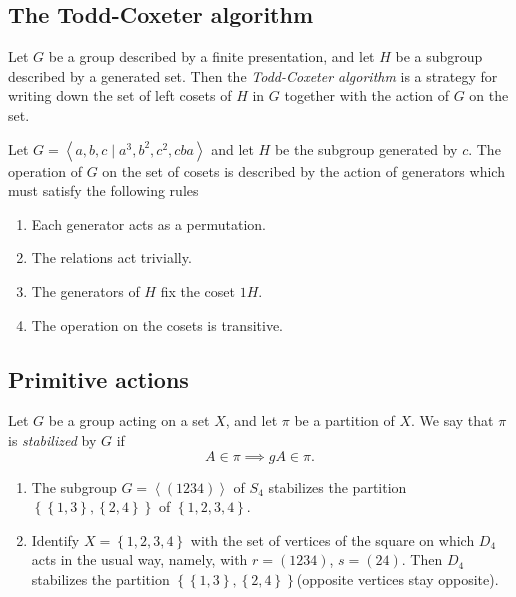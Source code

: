 \subsection{The Todd-Coxeter algorithm}
\label{subsection-the-Todd-Coxeter-algorithm}

Let \( G \) be a group described by a finite presentation, and let \( H \) be a subgroup described by a generated set.
Then the \emph{Todd-Coxeter algorithm} is a strategy for writing down the set of left cosets of \( H \) in \( G \) together with the action of \( G \) on the set.

Let \( G = \left\langle a, b, c \mid a^3, b^2, c^2, cba \right\rangle \) and let \( H \) be the subgroup generated by \( c \).
The operation of \( G \) on the set of cosets is described by the action of generators which must satisfy the following rules
\begin{enumerate}
  \item Each generator acts as a permutation.
  \item The relations act trivially.
  \item The generators of \( H \) fix the coset \( 1H \).
  \item The operation on the cosets is transitive.
\end{enumerate}

\subsection{Primitive actions}
\label{subsection-primitive-actions}

\begin{definition}
  \label{definition-stabilized-partition}
  Let \( G \) be a group acting on a set \( X \), and let \( \pi \) be a partition of \( X \).
  We say that \( \pi \) is \emph{stabilized} by \( G \) if
  \[
    A \in \pi \implies gA \in \pi.
  \]
\end{definition}

\begin{example}
  \label{example-stabilized-action-on-1234}
  \begin{enumerate}
    \item The subgroup \( G = \left\langle (1234) \right\rangle \) of \( S_4 \) stabilizes the partition \( \left\lbrace \left\lbrace 1, 3 \right\rbrace, \left\lbrace 2, 4 \right\rbrace \right\rbrace \) of \( \left\lbrace 1, 2, 3, 4 \right\rbrace \).
    \item Identify \( X = \left\lbrace 1, 2, 3, 4 \right\rbrace \) with the set of vertices of the square on which \( D_4 \) acts in the usual way, namely, with \( r = (1234) \), \( s = (24) \).
      Then \( D_4 \) stabilizes the partition \( \left\lbrace \left\lbrace 1, 3 \right\rbrace, \left\lbrace 2, 4 \right\rbrace \right\rbrace \)(opposite vertices stay opposite).
  \end{enumerate}
\end{example}

